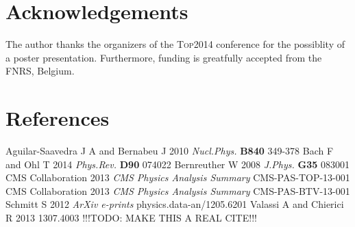 \documentclass[a4paper]{jpconf}
\begin{document}
\section{Acknowledgements}
The author thanks the organizers of the \textsc{Top2014} conference for the possiblity of a poster presentation. Furthermore, funding is greatfully accepted from the FNRS, Belgium.


\section*{References}
\begin{thebibliography}{7}
 Aguilar-Saavedra J A and Bernabeu J 2010 {\it Nucl.Phys.} {\bf B840} 349-378 
 Bach F and Ohl T 2014 {\it Phys.Rev.} {\bf D90} 074022 
 Bernreuther W 2008 {\it J.Phys.} {\bf G35} 083001 
 CMS Collaboration 2013 {\it CMS Physics Analysis Summary} CMS-PAS-TOP-13-001
 CMS Collaboration 2013 {\it CMS Physics Analysis Summary} CMS-PAS-BTV-13-001
 Schmitt S 2012 {\it ArXiv e-prints} physics.data-an/1205.6201
 Valassi A and Chierici R 2013 1307.4003 !!!TODO: MAKE THIS A REAL CITE!!!
\end{thebibliography}
\end{document}

